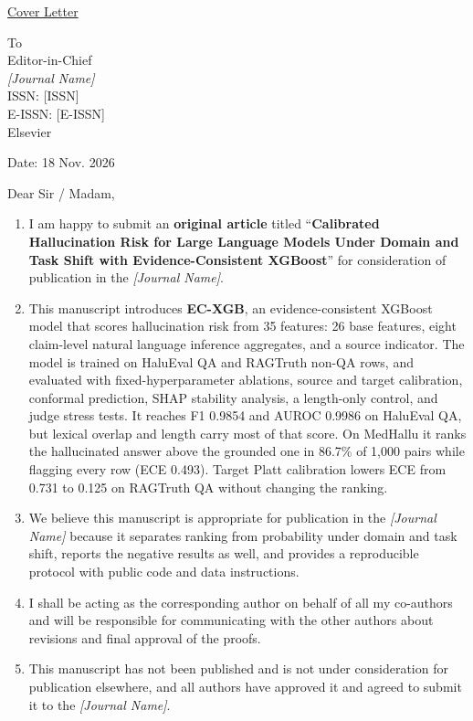 \documentclass[11pt]{article}
\begin{document}
\begin{center}
{\Large\underline{Cover Letter}}
\end{center}

\vspace{0.4em}

\noindent
\begin{minipage}[t]{0.62\linewidth}
To\\[0.35em]
Editor-in-Chief\\
\emph{[Journal Name]}\\
ISSN: [ISSN]\\
E-ISSN: [E-ISSN]\\
Elsevier
\end{minipage}%
\begin{minipage}[t]{0.38\linewidth}
\raggedleft
Date: 18 Nov. 2026
\end{minipage}

\vspace{0.6em}

Dear Sir / Madam,

\begin{enumerate}
  \item I am happy to submit an \textbf{original article} titled ``\textbf{Calibrated Hallucination Risk for Large Language Models Under Domain and Task Shift with Evidence-Consistent XGBoost}'' for consideration of publication in the \emph{[Journal Name]}.

  \item This manuscript introduces \textbf{EC-XGB}, an evidence-consistent XGBoost model that scores hallucination risk from 35 features: 26 base features, eight claim-level natural language inference aggregates, and a source indicator. The model is trained on HaluEval QA and RAGTruth non-QA rows, and evaluated with fixed-hyperparameter ablations, source and target calibration, conformal prediction, SHAP stability analysis, a length-only control, and judge stress tests. It reaches F1 0.9854 and AUROC 0.9986 on HaluEval QA, but lexical overlap and length carry most of that score. On MedHallu it ranks the hallucinated answer above the grounded one in 86.7\% of 1{,}000 pairs while flagging every row (ECE 0.493). Target Platt calibration lowers ECE from 0.731 to 0.125 on RAGTruth QA without changing the ranking.

  \item We believe this manuscript is appropriate for publication in the \emph{[Journal Name]} because it separates ranking from probability under domain and task shift, reports the negative results as well, and provides a reproducible protocol with public code and data instructions.

  \item I shall be acting as the corresponding author on behalf of all my co-authors and will be responsible for communicating with the other authors about revisions and final approval of the proofs.

  \item This manuscript has not been published and is not under consideration for publication elsewhere, and all authors have approved it and agreed to submit it to the \emph{[Journal Name]}.
\end{enumerate}
\end{document}
